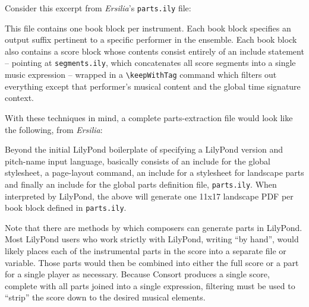 Consider this excerpt from \emph{Ersilia}'s \texttt{parts.ily} file:


\noindent This file contains one book block per instrument. Each book block
specifies an output suffix pertinent to a specific performer in the ensemble.
Each book block also contains a score block whose contents consist entirely of
an include statement -- pointing at \texttt{segments.ily}, which concatenates
all score segments into a single music expression -- wrapped in a
\texttt{\textbackslash{}keepWithTag} command which filters out everything
except that performer's musical content and the global time signature context.

With these techniques in mind, a complete parts-extraction file would
look like the following, from \emph{Ersilia}:


\noindent Beyond the initial LilyPond boilerplate of specifying a LilyPond
version and pitch-name input language, basically consists of an include for the
global stylesheet, a page-layout command, an include for a stylesheet for
landscape parts and finally an include for the global parts definition file,
\texttt{parts.ily}. When interpreted by LilyPond, the above will generate one
11x17 landscape PDF per book block defined in \texttt{parts.ily}.

Note that there are methods by which composers can generate parts in
LilyPond. Most LilyPond users who work strictly with LilyPond, writing
\enquote{by hand}, would likely places each of the instrumental parts in the
score into a separate file or variable. Those parts would then be combined into
either the full score or a part for a single player as necessary. Because
Consort produces a single score, complete with all parts joined into a single
expression, filtering must be used to \enquote{strip} the score down to the
desired musical elements.

